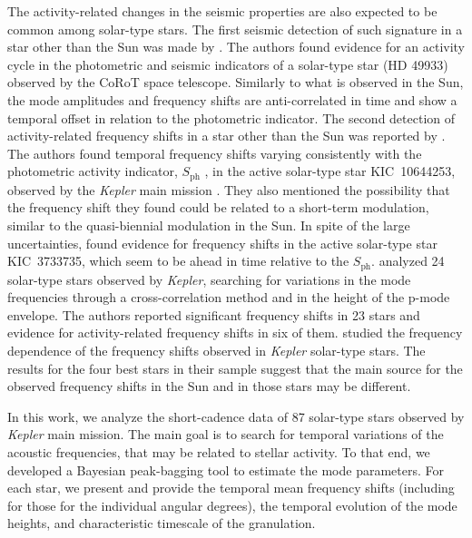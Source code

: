 \documentclass[twocolumn]{aastex61}%
\begin{document}
The activity-related changes in the seismic properties are also expected to be common among solar-type stars. The first seismic detection of such signature in a star other than the Sun was made by \citet{Garcia2010}. The authors found evidence for an activity cycle in the photometric and seismic indicators of a solar-type star (HD 49933) observed by the CoRoT \citep[Convection, Rotation, and planetary Transits;][]{Baglin2006} space telescope. Similarly to what is observed in the Sun, the mode amplitudes and frequency shifts are anti-correlated in time and show a temporal offset in relation to the photometric indicator. The second detection of activity-related frequency shifts in a star other than the Sun was reported by \citet{Salabert2016}. The authors found temporal frequency shifts varying consistently with the photometric activity indicator, $S_\text{ph}$ \citep{Mathur2014,Garcia2014}, in the active solar-type star KIC~10644253, observed by the {\it Kepler} main mission \citep{Borucki2010}. They also mentioned the possibility that the frequency shift they found could be related to a short-term modulation, similar to the quasi-biennial modulation in the Sun. In spite of the large uncertainties, \citet{Regulo2016} found evidence for frequency shifts in the active solar-type star KIC~3733735, which seem to be ahead in time relative to the $S_\text{ph}$. \citet{Kiefer2017} analyzed 24 solar-type stars observed by {\it Kepler}, searching for variations in the mode frequencies through a cross-correlation method and in the height of the p-mode envelope. The authors reported significant frequency shifts in 23 stars and evidence for activity-related frequency shifts in six of them. \citet{Salabert2017b} studied the frequency dependence of the frequency shifts observed in {\it Kepler} solar-type stars. The results for the four best stars in their sample suggest that the main source for the observed frequency shifts in the Sun and in those stars may be different.

In this work, we analyze the short-cadence data of 87 solar-type stars observed by {\it Kepler} main mission. The main goal is to search for temporal variations of the acoustic frequencies, that may be related to stellar activity. To that end, we developed a Bayesian peak-bagging tool to estimate the mode parameters. For each star, we present and provide the temporal mean frequency shifts (including for those for the individual angular degrees), the temporal evolution of the mode heights, and characteristic timescale of the granulation. %
\end{document}
